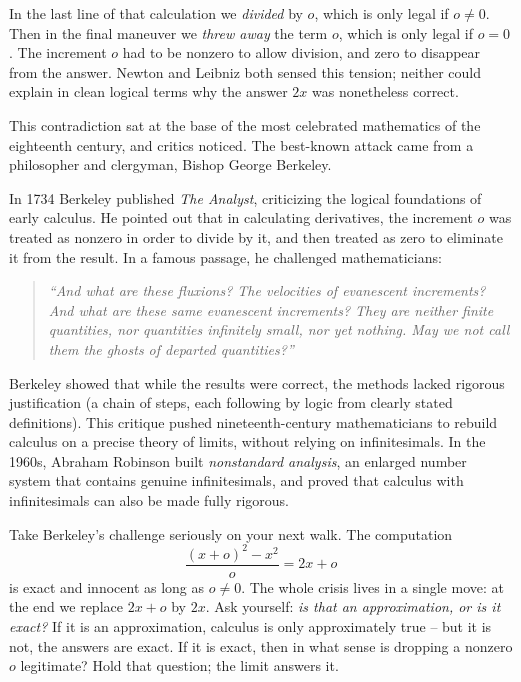 In the last line of that calculation we \emph{divided} by $o$, which is
only legal if $o \neq 0$. Then in the final maneuver we \emph{threw away} the term $o$, which is
only legal if $o = 0$. The increment $o$ had to be nonzero to allow division, and zero to
disappear from the answer. Newton and Leibniz both sensed this tension; neither could explain
in clean logical terms why the answer $2x$ was nonetheless correct.

This contradiction sat at the base of the most celebrated mathematics of the eighteenth century,
and critics noticed. The best-known attack came from a philosopher and clergyman, Bishop
George Berkeley.

\begin{historybox}
In 1734 Berkeley published \emph{The Analyst},
criticizing the logical foundations of early calculus. He pointed out that in calculating
derivatives, the increment $o$ was treated as nonzero in order to divide by it, and then
treated as zero to eliminate it from the result. In a famous passage, he challenged mathematicians:
\begin{quote}
\emph{``And what are these fluxions? The velocities of evanescent increments? And what are these same evanescent increments? They are neither finite quantities, nor quantities infinitely small, nor yet nothing. May we not call them the ghosts of departed quantities?''}
\end{quote}
Berkeley showed that while the results were correct, the methods lacked rigorous justification
(a chain of steps, each following by logic from clearly stated definitions).
This critique pushed nineteenth-century mathematicians to rebuild calculus on a precise theory
of limits, without relying on infinitesimals. In the 1960s, Abraham Robinson built \emph{nonstandard
analysis}, an enlarged number system that contains genuine infinitesimals, and proved that
calculus with infinitesimals can also be made fully rigorous.
\end{historybox}

\begin{walkbox}
Take Berkeley's challenge seriously on your next walk. The computation
\[
  \frac{(x+o)^2-x^2}{o} = 2x + o
\]
is exact and innocent as long as $o\neq 0$. The whole crisis lives in a single move: at
the end we replace $2x + o$ by $2x$. Ask yourself: \emph{is that an approximation, or is it
exact?} If it is an approximation, calculus is only approximately true -- but it is not, the
answers are exact. If it is exact, then in what sense is dropping a nonzero $o$ legitimate? Hold
that question; the limit answers it.
\end{walkbox}

